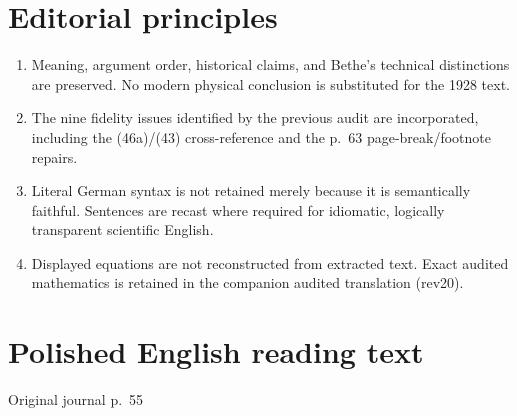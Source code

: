 \documentclass[10pt]{article}
\newcommand{\origpage}[1]{\par\medskip\noindent\hfill{\small\color{notegray}Original journal p.~#1}\hfill\mbox{}\par\smallskip}
\begin{document}
\section*{Editorial principles}
\begin{enumerate}[leftmargin=1.7em,itemsep=0.25em]
\item Meaning, argument order, historical claims, and Bethe's technical distinctions are preserved. No modern physical conclusion is substituted for the 1928 text.
\item The nine fidelity issues identified by the previous audit are incorporated, including the (46a)/(43) cross-reference and the p.~63 page-break/footnote repairs.
\item Literal German syntax is not retained merely because it is semantically faithful. Sentences are recast where required for idiomatic, logically transparent scientific English.
\item Displayed equations are not reconstructed from extracted text. Exact audited mathematics is retained in the companion audited translation (rev20).
\end{enumerate}
\section*{Polished English reading text}
\origpage{55}
\end{document}
